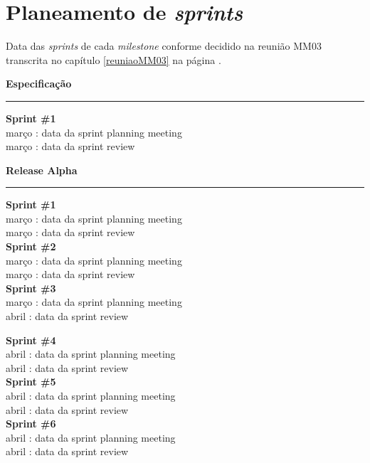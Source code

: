 
\section{Planeamento de \textit{sprints}}

Data das \textit{sprints} de cada \textit{milestone} conforme decidido na reunião MM03 transcrita no capítulo \ref{reuniaoMM03} na página \pageref{reuniaoMM03}.\\[4mm]

\begin{minipage}{\linewidth}
\noindent \textbf{Especificação}\\[1mm]
\noindent \rule{\linewidth}{0.4pt}
\noindent \textbf{Sprint \#1}\\[1mm]
 março : data da sprint planning meeting\\[1mm]
 março : data da sprint review\\[4mm]
\end{minipage}

\begin{minipage}{\linewidth}
\noindent \textbf{Release Alpha}\\[1mm]
\noindent \rule{\linewidth}{0.4pt}
\noindent \textbf{Sprint \#1}\\[1mm]
 março : data da sprint planning meeting\\[1mm]
 março : data da sprint review\\[3mm]
\noindent \textbf{Sprint \#2}\\[1mm]
 março : data da sprint planning meeting\\[1mm]
 março : data da sprint review\\[3mm]
\noindent \textbf{Sprint \#3}\\[1mm]
 março : data da sprint planning meeting\\[1mm]
 abril : data da sprint review\\[3mm]
\end{minipage}

\begin{minipage}{\linewidth}
\noindent \textbf{Sprint \#4}\\[1mm]
 abril : data da sprint planning meeting\\[1mm]
 abril : data da sprint review\\[3mm]
\noindent \textbf{Sprint \#5}\\[1mm]
 abril : data da sprint planning meeting\\[1mm]
 abril : data da sprint review\\[3mm]
\noindent \textbf{Sprint \#6}\\[1mm]
 abril : data da sprint planning meeting\\[1mm]
 abril : data da sprint review\\[4mm]
\end{minipage}

